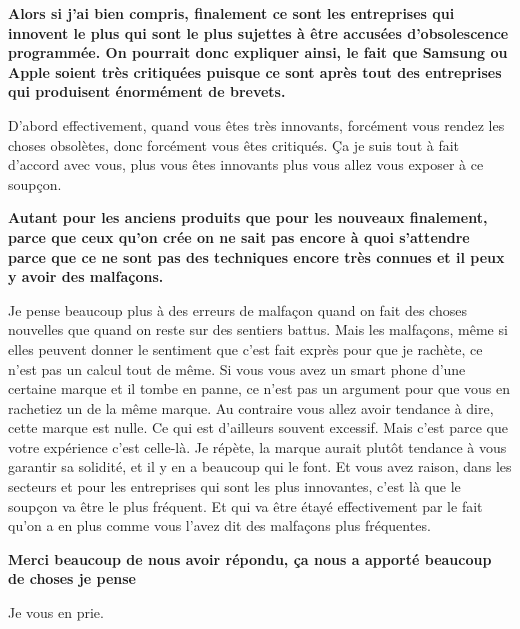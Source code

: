 \begin{small}
\textbf{Alors si j'ai bien compris, finalement ce sont les entreprises qui innovent le plus qui sont le plus sujettes à être accusées d'obsolescence programmée. On pourrait donc expliquer ainsi, le fait que Samsung ou Apple soient très critiquées puisque ce sont après tout des entreprises qui produisent énormément de brevets. }
\smallbreak


D'abord effectivement, quand vous êtes très innovants, forcément vous rendez les choses obsolètes, donc forcément vous êtes critiqués. Ça je suis tout à fait d'accord avec vous, plus vous êtes innovants plus vous allez vous exposer à ce soupçon. 

\textbf{Autant pour les anciens produits que pour les nouveaux finalement, parce que ceux qu'on crée on ne sait pas encore à quoi s'attendre parce que ce ne sont pas des  techniques  encore très connues et il peux y avoir des malfaçons.}
\smallbreak


Je pense beaucoup plus à des erreurs de malfaçon quand on fait des choses nouvelles que quand on reste sur des sentiers battus. Mais les malfaçons, même si elles peuvent donner le sentiment que c'est fait exprès pour que je rachète, ce n'est pas un calcul tout de même. Si vous vous avez un smart phone d'une certaine marque et il tombe en panne, ce n'est pas un argument pour que vous en rachetiez un de la même marque. Au contraire vous allez avoir tendance à dire, cette marque est nulle. Ce qui est d'ailleurs souvent excessif. Mais c'est parce que votre expérience c'est celle-là. Je répète, la marque aurait plutôt tendance à vous garantir sa solidité, et il y en a beaucoup qui le font. Et vous avez raison, dans les secteurs et pour les entreprises qui sont les plus innovantes, c'est là que le soupçon va être le plus fréquent. Et qui va être étayé effectivement par le fait qu'on a en plus comme vous l'avez dit des malfaçons plus fréquentes. 

\textbf{Merci beaucoup de nous avoir répondu, ça nous a apporté beaucoup de choses je pense}
\smallbreak


Je vous en prie.

\end{small}
